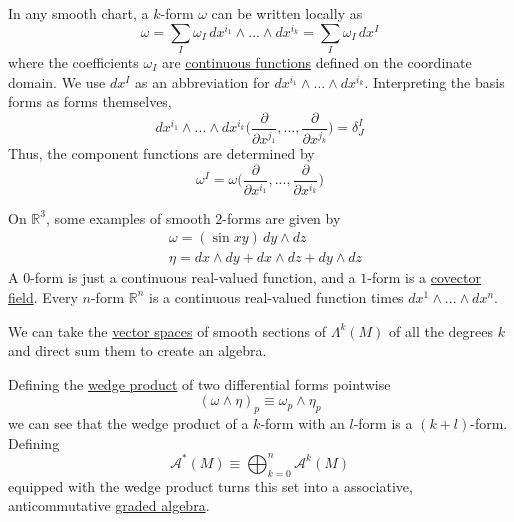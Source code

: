 \documentclass{article}
\newcounter{definition}[section]
\newcounter{example}[section]
\begin{document}
    In any smooth chart, a $k$-form $\omega$ can be written locally as 
    \begin{equation}
      \omega = \sum_I \omega_I \, dx^{i_1} \wedge ... \wedge dx^{i_k} = \sum_I \omega_I \, dx^I
    \end{equation}
    where the coefficients $\omega_I$ are \hyperref[pst-def:continuous_func]{continuous functions} defined on the coordinate domain. We use $dx^I$ as an abbreviation for $dx^{i_1} \wedge ... \wedge dx^{i_k}$. Interpreting the basis forms as forms themselves, 
    \begin{equation}
      dx^{i_1} \wedge ... \wedge dx^{i_k} \bigg( \frac{\partial}{\partial x^{j_1}}, ..., \frac{\partial}{\partial x^{j_k}} \bigg) = \delta^I_J
    \end{equation}
    Thus, the component functions are determined by
    \begin{equation}
      \omega^I = \omega \bigg( \frac{\partial}{\partial x^{i_1}}, ... ,\frac{\partial}{\partial x^{i_k}} \bigg)
    \end{equation}

    \begin{example}
      \label{ex:smooth-2-forms-on-r3}
    On $\mathbb{R}^3$, some examples of smooth $2$-forms are given by 
    \begin{align*}
        & \omega = (\sin{xy}) \,dy \wedge dz \\
        & \eta = dx \wedge dy + dx \wedge dz + dy \wedge dz 
    \end{align*}
    A $0$-form is just a continuous real-valued function, and a $1$-form is a \hyperref[def:covector-field]{covector field}. Every $n$-form $\mathbb{R}^n$ is a continuous real-valued function times $dx^1 \wedge ... \wedge dx^n$. 
    \end{example}

    We can take the \hyperref[lin-def:vector-space]{vector spaces} of smooth sections of $\Lambda^k (M)$ of all the degrees $k$ and direct sum them to create an algebra. 

    \begin{definition}
      \label{def:wedge-product-of-differential-forms}
    Defining the \hyperref[def:wedge-product]{wedge product} of two differential forms pointwise
    \begin{equation}
      (\omega \wedge \eta)_p \equiv \omega_p \wedge \eta_p
    \end{equation}
    we can see that the wedge product of a $k$-form with an $l$-form is a $(k+l)$-form. Defining 
    \begin{equation}
      \mathcal{A}^* (M) \equiv \bigoplus_{k=0}^n \mathcal{A}^k (M)
    \end{equation}
    equipped with the wedge product turns this set into a associative, anticommutative \hyperref[def:graded-algebra]{graded algebra}. 
    \end{definition}
\end{document}
